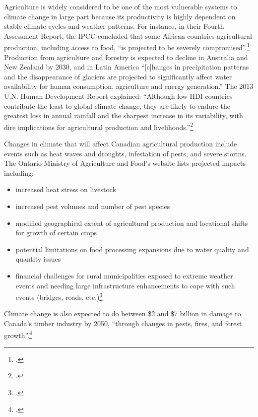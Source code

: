 Agriculture is widely considered to be one of the most vulnerable systems to climate change in large part because its productivity is highly dependent on stable climate cycles and weather patterns.
For instance, in their Fourth Assessment Report, the IPCC concluded that some African countries agricultural production, including access to food, ``is projected to be severely compromised''.\footcite[][See: Synthesis report, Table SPM.2. Examples of some projected regional impacts. \url{https://www.ipcc.ch/publications_and_data/ar4/syr/en/spms3.html}]{IPCC2007}
Production from agriculture and forestry is expected to decline in Australia and New Zealand by 2030, and in Latin America ``[c]hanges in precipitation patterns and the disappearance of glaciers are projected to significantly affect water availability for human consumption, agriculture and energy generation.''
The 2013 U.N. Human Development Report explained: ``Although low HDI countries contribute the least to global climate change, they are likely to endure the greatest loss in annual rainfall and the sharpest increase in its variability, with dire implications for agricultural production and livelihoods.''\footcite[][p. 6]{UNHumanDev2013}



Changes in climate that will affect Canadian agricultural production include events such as heat waves and droughts, infestation of pests, and severe storms.
The Ontario Ministry of Agriculture and Food's website lists projected impacts including:
\begin{itemize}
	\item increased heat stress on livestock
	\item increased pest volumes and number of pest species
	\item modified geographical extent of agricultural production and locational shifts for growth of certain crops
	\item potential limitations on food processing expansions due to water quality and quantity issues
	\item financial challenges for rural municipalities exposed to extreme weather events and needing large infrastructure enhancements to cope with such events (bridges, roads, etc.)\footcite{OntarioCCandAg}
\end{itemize}
Climate change is also expected to do between \$2 and \$7 billion in damage to Canada's timber industry by 2050, ``through changes in pests, fires, and forest growth''.\footcite[][p.16]{NRTEEPrice}


